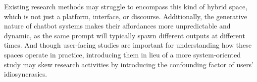Existing research methods may struggle to encompass this kind of hybrid space, which is not just a platform, interface, or discourse. Additionally, the generative nature of chatbot systems makes their affordances more unpredictable and dynamic, as the same prompt will typically spawn different outputs at different times. And though user-facing studies are important for understanding how these spaces operate in practice, introducing them in lieu of a more system-oriented study may skew research activities by introducing the confounding factor of users' idiosyncrasies.
